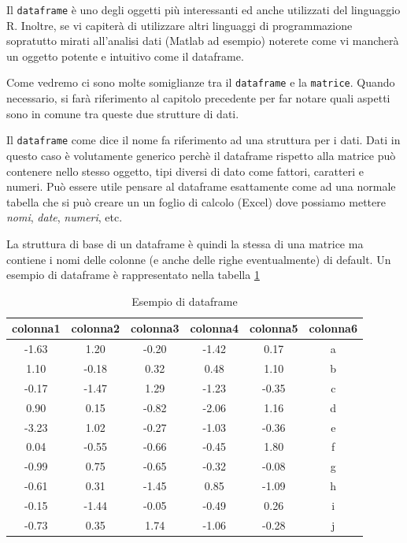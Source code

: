\documentclass[
]{book}
\begin{document}
Il \texttt{dataframe} è uno degli oggetti più interessanti ed anche utilizzati del linguaggio R. Inoltre, se vi capiterà di utilizzare altri linguaggi di programmazione sopratutto mirati all'analisi dati (Matlab ad esempio) noterete come vi mancherà un oggetto potente e intuitivo come il dataframe.

Come vedremo ci sono molte somiglianze tra il \texttt{dataframe} e la \texttt{matrice}. Quando necessario, si farà riferimento al capitolo precedente per far notare quali aspetti sono in comune tra queste due strutture di dati.

Il \texttt{dataframe} come dice il nome fa riferimento ad una struttura per i dati. Dati in questo caso è volutamente generico perchè il dataframe rispetto alla matrice può contenere nello stesso oggetto, tipi diversi di dato come fattori, caratteri e numeri. Può essere utile pensare al dataframe esattamente come ad una normale tabella che si può creare un un foglio di calcolo (Excel) dove possiamo mettere \emph{nomi}, \emph{date}, \emph{numeri}, etc.

La struttura di base di un dataframe è quindi la stessa di una matrice ma contiene i nomi delle colonne (e anche delle righe eventualmente) di default. Un esempio di dataframe è rappresentato nella tabella \ref{tab:ex-dataframe}

\begin{table}

\caption{\label{tab:ex-dataframe}Esempio di dataframe}
\centering
\begin{tabular}[t]{c|c|c|c|c|c}
\hline
colonna1 & colonna2 & colonna3 & colonna4 & colonna5 & colonna6\\
\hline
-1.63 & 1.20 & -0.20 & -1.42 & 0.17 & a\\
\hline
1.10 & -0.18 & 0.32 & 0.48 & 1.10 & b\\
\hline
-0.17 & -1.47 & 1.29 & -1.23 & -0.35 & c\\
\hline
0.90 & 0.15 & -0.82 & -2.06 & 1.16 & d\\
\hline
-3.23 & 1.02 & -0.27 & -1.03 & -0.36 & e\\
\hline
0.04 & -0.55 & -0.66 & -0.45 & 1.80 & f\\
\hline
-0.99 & 0.75 & -0.65 & -0.32 & -0.08 & g\\
\hline
-0.61 & 0.31 & -1.45 & 0.85 & -1.09 & h\\
\hline
-0.15 & -1.44 & -0.05 & -0.49 & 0.26 & i\\
\hline
-0.73 & 0.35 & 1.74 & -1.06 & -0.28 & j\\
\hline
\end{tabular}
\end{table}
\end{document}
